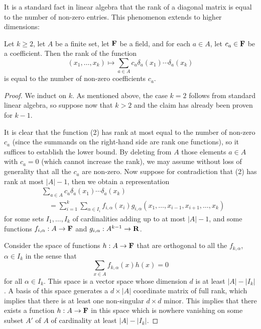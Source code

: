 It is a standard fact in linear algebra that the rank of a diagonal matrix is equal to the number of non-zero entries. This phenomenon extends to higher dimensions:
\begin{lemma}
Let $k\ge2$, let $A$ be a finite set, let ${\bf F}$ be a field, and for each $a\in A$, let $c_a\in{\bf F}$ be a coefficient. Then the rank of the function
\begin{equation}
(x_1,\ldots,x_k)\mapsto\sum_{a\in A}c_a\delta_a(x_1)\cdots\delta_a(x_k)\tag{2}
\end{equation}
is equal to the number of non-zero coefficients $c_a$.
\end{lemma}
\begin{proof}
We induct on $k$. As mentioned above, the case $k=2$ follows from standard linear algebra, so suppose now that $k>2$ and the claim has already been proven for $k-1$.

It is clear that the function (2) has rank at most equal to the number of non-zero $c_a$ (since the summands on the right-hand side are rank one functions), so it suffices to establish the lower bound. By deleting from $A$ those elements $a\in A$ with $c_a=0$ (which cannot increase the rank), we may assume without loss of generality that all the $c_a$ are non-zero. Now suppose for contradiction that (2) has rank at most $|A|-1$, then we obtain a representation
\begin{equation}
\begin{split}
&\sum_{a\in A}c_a\delta_a(x_1)\cdots\delta_a(x_k)\\
&\quad=\sum_{i=1}^k\sum_{\alpha\in I_i}f_{i,\alpha}(x_i)g_{i,\alpha}(x_1,\ldots,x_{i-1},x_{i+1},\ldots,x_k)
\end{split}\tag{3}
\end{equation}
for some sets $I_1,\ldots,I_k$ of cardinalities adding up to at most $|A|-1$, and some functions $f_{i,\alpha}:A\to{\bf F}$ and $g_{i,\alpha}:A^{k-1}\to{\bf R}$.

Consider the space of functions $h:A\to{\bf F}$ that are orthogonal to all the $f_{k,\alpha}$, $\alpha\in I_k$ in the sense that
\[
\sum_{x\in A}f_{k,\alpha}(x)h(x)=0
\]
for all $\alpha\in I_k$. This space is a vector space whose dimension $d$ is at least $|A|-|I_k|$. A basis of this space generates a $d\times|A|$ coordinate matrix of full rank, which implies that there is at least one non-singular $d\times d$ minor. This implies that there exists a function $h:A\to{\bf F}$ in this space which is nowhere vanishing on some subset $A'$ of $A$ of cardinality at least $|A|-|I_k|$.


\end{proof}
